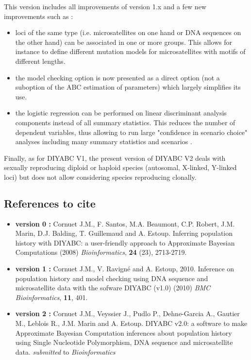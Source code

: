 \documentclass [a4paper]{report}
\let\subsectionv\subsection
\renewcommand{\subsection}[1]{\subsectionv{#1} \setcounter{paragraph}{0}}
\begin{document}
This version includes all improvements of version 1.x and a few new improvements such as :
\begin{itemize}
\item loci of the same type (i.e. microsatellites on one hand or DNA sequences on the other hand) can be associated in one or more groups. This allows for instance to define different mutation models for microsatellites with motifs of different lengths.
\item  the model checking option is now presented as a direct option (not a suboption of the ABC estimation of parameters) which largely simplifies its use.
\item the logistic regression can be performed on linear discriminant analysis components instead of all summary statistics. This reduces the number of dependent variables, thus allowing to run large "confidence in scenario choice" analyses including many summary statistics and scenarios \citep{EL2012}. 

\end{itemize}

Finally, as for DIYABC V1, the present version of DIYABC V2 deals with sexually reproducing diploid or haploid species (autosomal, X-linked, Y-linked loci) but does not allow considering species reproducing clonally. 

\subsection{References to cite}
\begin{itemize}
\item \textbf{version 0 :} Cornuet J.M., F. Santos, M.A. Beaumont, C.P. Robert, J.M. Marin, D.J. Balding, T. Guillemaud and A. Estoup. Inferring population history with DIYABC: a user-friendly approach to Approximate Bayesian Computations (2008) \emph{Bioinformatics}, \textbf{24} (23), 2713-2719.
\item  \textbf{version 1 :}  Cornuet J.M., V. Ravign\'e and A. Estoup, 2010. Inference on population history and model checking using DNA sequence and microsatellite data with the sofware DIYABC (v1.0) (2010) \emph{BMC Bioinformatics}, \textbf{11}, 401.
\item  \textbf{version 2 :}  Cornuet J.M., Veyssier J., Pudlo P., Dehne-Garcia A., Gautier M., Leblois R., J.M. Marin and A. Estoup. DIYABC v2.0: a software to make Approximate Bayesian Computation inferences about population history using Single Nucleotide Polymorphism, DNA sequence and microsatellite data. \emph{submitted} to \emph{Bioinformatics}
\end{itemize}
\end{document}
